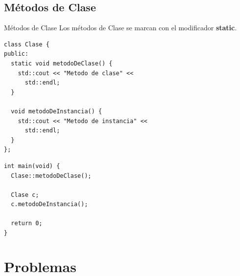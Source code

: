 \subsection{M\'etodos de Clase}
\begin{frame}{M\'etodos de Clase}{
  Los m\'etodos de Clase se marcan con el modificador \textbf{static}.
}
   \begin{lstlisting}[style=normal,firstnumber=1]
class Clase {
public:
  static void metodoDeClase() {
    std::cout << "Metodo de clase" <<
      std::endl;
  }

  void metodoDeInstancia() {
    std::cout << "Metodo de instancia" <<
      std::endl;
  }
};

   \end{lstlisting}

   \begin{lstlisting}[style=normal,firstnumber=14]
int main(void) {
  Clase::metodoDeClase();

  Clase c;
  c.metodoDeInstancia();

  return 0;
}

   \end{lstlisting}
\end{frame}

\section{Problemas}

